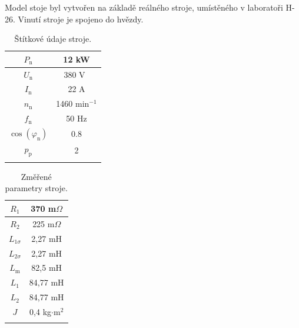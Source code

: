 \documentclass[a4paper, twoside, 11pt]{article}
\begin{document}
    \noindent Model stoje byl vytvořen na základě reálného stroje, umístěného v laboratoři H-26. Vinutí stroje je spojeno do hvězdy.\par

    \begin{minipage}[t]{0.47\textwidth}
        \vspace{\baselineskip}
        \begin{table}[H]
            \caption{Štítkové údaje stroje.}
            \centering
                \begin{tabular}{!{\vrule width 2pt} c | c !{\vrule width 2pt}}
                    $P_\text{n}$ & 12 kW \\ \hline
                    $U_\text{n}$ & 380 V~\\ \hline
                    $I_\text{n}$ & 22 A\\ \hline
                    $n_\text{n}$ & 1460 min$^{-1}$ \\ \hline
                    $f_\text{n}$ & 50 Hz \\ \hline
                    $\cos(\varphi_\text{n})$ &  0.8 \\ \hline
                    $p_\text{p}$ & 2 \\ 
                \end{tabular}     
            \label{tab:stitkove-udaje}
        \end{table}
        \end{minipage}%
        \hfill
        \begin{minipage}[t]{0.47\textwidth}
            \vspace{0pt}
            \begin{table}[H]
                \caption{Změřené parametry stroje.}
                \centering
                    \begin{tabular}{!{\vrule width 2pt} c | c !{\vrule width 2pt}}
                        $R_\text{1}$ & 370 m$\Omega$ \\ \hline
                        $R_\text{2}$ & 225 m$\Omega$ \\ \hline
                        $L_{1\sigma}$ & 2,27 mH \\ \hline
                        $L_{2\sigma}$ & 2,27 mH \\ \hline
                        $L_\text{m}$ & 82,5 mH \\ \hline
                        $L_{1}$ & 84,77 mH \\ \hline
                        $L_{2}$ & 84,77 mH \\ \hline $J$ & 0,4 kg$\cdot$m$^{2}$ \\ 
                    \end{tabular}     
                \label{tab:zmerene-parametry-stroje}
            \end{table}
        \end{minipage}
\end{document}
